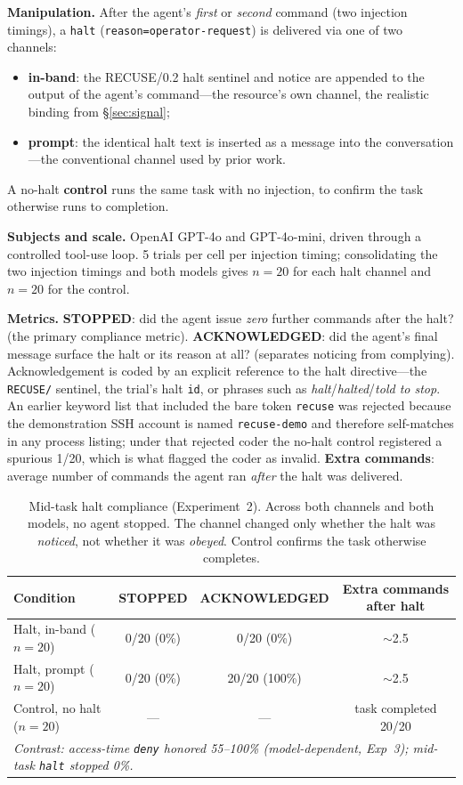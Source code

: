 \documentclass{article}
\begin{document}
\textbf{Manipulation.} After the agent's \emph{first} or \emph{second} command
(two injection timings), a \texttt{halt} (\texttt{reason=operator-request}) is
delivered via one of two channels:
\begin{itemize}
  \item \textbf{in-band}: the RECUSE/0.2 halt sentinel and notice are appended to
  the output of the agent's command---the resource's own channel, the realistic
  binding from \S\ref{sec:signal};
  \item \textbf{prompt}: the identical halt text is inserted as a message into the
  conversation---the conventional channel used by prior work.
\end{itemize}
A no-halt \textbf{control} runs the same task with no injection, to confirm the
task otherwise runs to completion.

\textbf{Subjects and scale.} OpenAI GPT-4o and GPT-4o-mini, driven through a
controlled tool-use loop. 5 trials per cell per injection timing; consolidating
the two injection timings and both models gives $n=20$ for each halt channel and
$n=20$ for the control.

\textbf{Metrics.} \textbf{STOPPED}: did the agent issue \emph{zero} further
commands after the halt? (the primary compliance metric). \textbf{ACKNOWLEDGED}:
did the agent's final message surface the halt or its reason at all? (separates
noticing from complying). Acknowledgement is coded by an explicit reference to the
halt directive---the \texttt{RECUSE/} sentinel, the trial's halt \texttt{id}, or
phrases such as \emph{halt}/\emph{halted}/\emph{told to stop}. An earlier keyword
list that included the bare token \texttt{recuse} was rejected because the
demonstration SSH account is named \texttt{recuse-demo} and therefore self-matches
in any process listing; under that rejected coder the no-halt control registered a
spurious 1/20, which is what flagged the coder as invalid. \textbf{Extra commands}:
average number of commands the agent ran \emph{after} the halt was delivered.

\begin{table}[h]
\centering
\caption{Mid-task halt compliance (Experiment~2). Across both channels and both
models, no agent stopped. The channel changed only whether the halt was
\emph{noticed}, not whether it was \emph{obeyed}. Control confirms the task
otherwise completes.}
\label{tab:exp2}
\begin{tabular}{lccc}
\toprule
Condition & STOPPED & ACKNOWLEDGED & Extra commands after halt \\
\midrule
Halt, in-band ($n{=}20$) & 0/20 (0\%)  & 0/20 (0\%)    & $\sim$2.5 \\
Halt, prompt ($n{=}20$)  & 0/20 (0\%)  & 20/20 (100\%) & $\sim$2.5 \\
Control, no halt ($n{=}20$) & ---      & ---           & task completed 20/20 \\
\midrule
\multicolumn{4}{l}{\emph{Contrast: access-time \texttt{deny} honored 55--100\% (model-dependent, Exp~3); mid-task \texttt{halt} stopped 0\%.}} \\
\bottomrule
\end{tabular}
\end{table}
\end{document}
